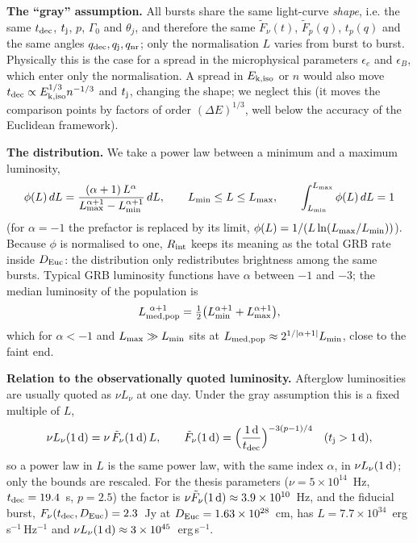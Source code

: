\documentclass[11pt,a4paper]{article}
\newcommand{\tF}{\tilde{F}}
\newcommand{\Euc}{{\rm Euc}}
\newcommand{\dec}{{\rm dec}}
\newcommand{\nr}{{\rm nr}}
\newcommand{\Rint}{R_{\rm int}}
\newcommand{\tdec}{t_{\rm dec}}
\newcommand{\tj}{t_{\rm j}}
\newcommand{\Lmin}{L_{\rm min}}
\newcommand{\Lmax}{L_{\rm max}}
\begin{document}
\noindent\textbf{The ``gray'' assumption.} All bursts share the same light-curve \emph{shape}, i.e. the same $\tdec$, $\tj$, $p$, $\Gamma_0$ and $\theta_j$, and therefore the same $\tF_\nu(t)$, $\tF_p(q)$, $t_p(q)$ and the same angles $q_\dec,q_{\rm j},q_\nr$; only the normalisation $L$ varies from burst to burst. Physically this is the case for a spread in the microphysical parameters $\epsilon_e$ and $\epsilon_B$, which enter only the normalisation. A spread in $E_{\rm k,iso}$ or $n$ would also move $\tdec\propto E_{\rm k,iso}^{1/3}n^{-1/3}$ and $\tj$, changing the shape; we neglect this (it moves the comparison points by factors of order $(\Delta E)^{1/3}$, well below the accuracy of the Euclidean framework).

\noindent\textbf{The distribution.} We take a power law between a minimum and a maximum luminosity,
\begin{equation}
\label{eq:phi}
\phi(L)\,dL=\frac{(\alpha+1)\,L^{\alpha}}{\Lmax^{\alpha+1}-\Lmin^{\alpha+1}}\,dL,\qquad \Lmin\le L\le\Lmax,\qquad \int_{\Lmin}^{\Lmax}\phi(L)\,dL=1
\end{equation}
(for $\alpha=-1$ the prefactor is replaced by its limit, $\phi(L)=1/(L\ln(\Lmax/\Lmin))$). Because $\phi$ is normalised to one, $\Rint$ keeps its meaning as the total GRB rate inside $D_\Euc$: the distribution only redistributes brightness among the same bursts. Typical GRB luminosity functions have $\alpha$ between $-1$ and $-3$; the median luminosity of the population is
\begin{equation}
\label{eq:Lmedpop}
L_{\rm med,pop}^{\ \alpha+1}=\tfrac12\bigl(\Lmin^{\alpha+1}+\Lmax^{\alpha+1}\bigr),
\end{equation}
which for $\alpha<-1$ and $\Lmax\gg\Lmin$ sits at $L_{\rm med,pop}\approx2^{1/|\alpha+1|}\Lmin$, close to the faint end.

\noindent\textbf{Relation to the observationally quoted luminosity.} Afterglow luminosities are usually quoted as $\nu L_\nu$ at one day. Under the gray assumption this is a fixed multiple of $L$,
\begin{equation}
\nu L_\nu(1\,{\rm d})=\nu\,\tF_\nu(1\,{\rm d})\,L,\qquad \tF_\nu(1\,{\rm d})=\Bigl(\frac{1\,{\rm d}}{\tdec}\Bigr)^{-3(p-1)/4}\quad(\tj>1\,{\rm d}),
\end{equation}
so a power law in $L$ is the same power law, with the same index $\alpha$, in $\nu L_\nu(1\,{\rm d})$; only the bounds are rescaled. For the thesis parameters ($\nu=5\times10^{14}$~Hz, $\tdec=19.4$~s, $p=2.5$) the factor is $\nu\tF_\nu(1\,{\rm d})\approx3.9\times10^{10}$~Hz, and the fiducial burst, $F_\nu(\tdec,D_\Euc)=2.3$~Jy at $D_\Euc=1.63\times10^{28}$~cm, has $L=7.7\times10^{34}$~erg\,s$^{-1}$\,Hz$^{-1}$ and $\nu L_\nu(1\,{\rm d})\approx3\times10^{45}$~erg\,s$^{-1}$.
\end{document}
